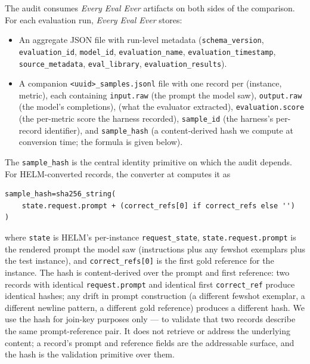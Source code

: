 \documentclass[11pt]{article}
\newcommand{\eee}{\textit{Every Eval Ever}\xspace}
\begin{document}
The audit consumes \eee{} artifacts on both sides of the comparison.
For each evaluation run, \eee{} stores:
\begin{itemize}
  \item An aggregate JSON file with run-level metadata
        (\texttt{schema\_version}, \texttt{evaluation\_id},
        \texttt{model\_id}, \texttt{evaluation\_name},
        \texttt{evaluation\_timestamp}, \texttt{source\_metadata},
        \texttt{eval\_library},
        \texttt{evaluation\_results}).
  \item A companion \texttt{<uuid>\_samples.jsonl} file with one
        record per (instance, metric), each containing
        \texttt{input.raw} (the prompt the model saw),
        \texttt{output.raw} (the model's completions),
         (what the
        evaluator extracted),
        \texttt{evaluation.score} (the per-metric score the harness
        recorded),
        \texttt{sample\_id} (the harness's per-record identifier),
        and \texttt{sample\_hash} (a content-derived hash we compute
        at conversion time; the formula is given below).
\end{itemize}

The \texttt{sample\_hash} is the central identity primitive on which
  the audit depends.
For HELM-converted records, the converter at
  computes it as
\begin{lstlisting}[style=python, caption={\eee{} HELM converter
  \texttt{sample\_hash} formula (excerpt; verbatim from
  \path{instance_level_adapter.py:231--233}).\label{lst:tr-sample-hash}}]
sample_hash=sha256_string(
    state.request.prompt + (correct_refs[0] if correct_refs else '')
)
\end{lstlisting}
where \texttt{state} is HELM's per-instance \texttt{request\_state},
  \texttt{state.request.prompt} is the rendered prompt the model saw
  (instructions plus any fewshot exemplars plus the test instance),
  and \texttt{correct\_refs[0]} is the first gold reference for the
  instance.
The hash is content-derived over the prompt and first reference:
  two records with identical \texttt{request.prompt} and identical
  first \texttt{correct\_ref} produce identical hashes; any drift in
  prompt construction (a different fewshot exemplar, a different
  newline pattern, a different gold reference) produces a different
  hash.
We use the hash for join-key purposes only --- to validate that two
  records describe the same prompt-reference pair.
It does not retrieve or address the underlying content; a record's
  prompt and reference fields are the addressable surface, and the
  hash is the validation primitive over them.
\end{document}
